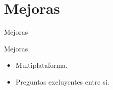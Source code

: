 \section{Mejoras}
\begin{frame}
\end{frame}

\begin{frame}{Mejoras}
 \begin{block}{Mejoras}
  \begin{itemize}
   \item Multiplataforma.
   \item Preguntas excluyentes entre si.
  \end{itemize}
 \end{block}
\end{frame}
